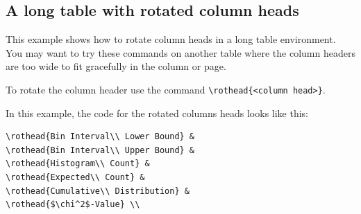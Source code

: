 \documentclass[reprint]{JASA}
\begin{document}
\subsection{A long table with rotated column heads}
This example shows how to rotate column heads in a long table
environment. You may want to try these commands on another
table where the column headers are too wide to fit gracefully
in the column or page.

To rotate the column header use the command \verb+\rothead{<column head>}+.

In this example, the code for the rotated columns heads looks like
this:

\begin{verbatim}
\rothead{Bin Interval\\ Lower Bound} & 
\rothead{Bin Interval\\ Upper Bound} & 
\rothead{Histogram\\ Count} & 
\rothead{Expected\\ Count} & 
\rothead{Cumulative\\ Distribution} & 
\rothead{$\chi^2$-Value} \\
\end{verbatim}

\renewcommand{\theadfont}{\normalsize\boldmath\bfseries}
\settowidth{\rotheadsize}{\bfseries Upper Bound}
\setlength{\extrarowheight}{2pt}
\end{document}
